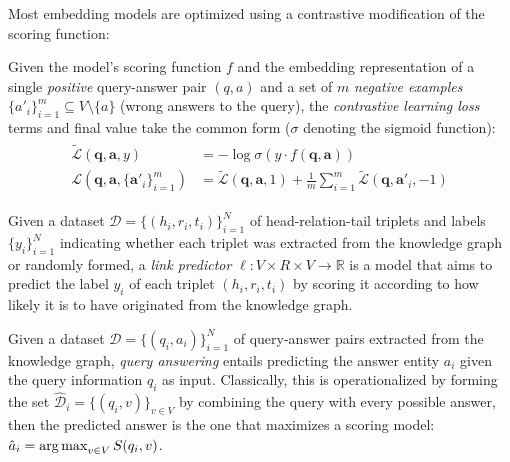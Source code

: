 Most embedding models are optimized using a contrastive modification of the scoring function:
\begin{definition}
\label{def:contrastive_loss}
    Given the model's scoring function $f$ and the embedding representation of a single \emph{positive} query-answer pair $(q, a)$ and a set of $m$ \emph{negative examples} $\{a'_i\}_{i=1}^{m} \subseteq V \setminus \{a\}$ (wrong answers to the query), the \emph{contrastive learning loss} terms and final value take the common form ($\sigma$ denoting the sigmoid function):
    \begin{align}
    \begin{aligned}
    \label{eq:contrastive_loss}
        \tilde{\mathcal{L}}(\mathbf{q}, \mathbf{a}, y)&=-\log{\sigma{\left(y \cdot f(\mathbf{q},\mathbf{a})\right)}}\\
        \mathcal{L}\left(\mathbf{q}, \mathbf{a}, \{\mathbf{a}'_i\}_{i=1}^{m}\right)&=\tilde{\mathcal{L}}(\mathbf{q}, \mathbf{a}, 1) + \frac{1}{m}\sum_{i=1}^{m}{\tilde{\mathcal{L}}\left(\mathbf{q}, \mathbf{a}'_i, -1\right)}
        \end{aligned}
    \end{align}
\end{definition}

\begin{definition}
    Given a dataset $\mathcal{D}=\{(h_i, r_i, t_i)\}_{i=1}^{N}$ of head-relation-tail triplets and labels $\{y_i\}_{i=1}^{N}$ indicating whether each triplet was extracted from the knowledge graph or randomly formed, a \emph{link predictor} $\ell: V \times R \times V \to \mathbb{R}$ is a model that aims to predict the label $y_i$ of each triplet $(h_i,r_i,t_i)$ by scoring it according to how likely it is to have originated from the knowledge graph.
\end{definition}


\begin{definition}
    Given a dataset $\mathcal{D}=\{(q_i, a_i)\}_{i=1}^{N}$ of query-answer pairs extracted from the knowledge graph, \emph{query answering} entails predicting the answer entity $a_i$ given the query information $q_i$ as input. Classically, this is operationalized by forming the set $\hat{\mathcal{D}}_i=\{(q_i, v)\}_{v \in V}$ by combining the query with every possible answer, then the predicted answer is the one that maximizes a scoring model: $\hat{a}_i = \operatorname*{arg\,max}_{v \in V}{S(q_i,v)}$.
\end{definition}

